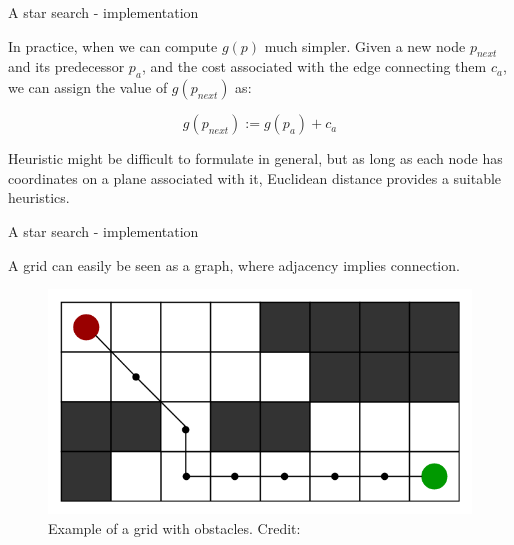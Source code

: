 \documentclass{beamer}
\begin{document}
\begin{frame}{A star search - implementation}
	\begin{flushleft}
		
		In practice, when we can compute $g(p)$ much simpler. Given a new node $p_{next}$ and its predecessor $p_a$, and the cost associated with the edge connecting them $c_a$, we can assign the value of $g(p_{next})$ as:
		
		\begin{equation}
			g(p_{next}) := g(p_a) + c_a
		\end{equation}
	
		Heuristic might be difficult to formulate in general, but as long as each node has coordinates on a plane associated with it, Euclidean distance provides a suitable heuristics.
		
	\end{flushleft}
\end{frame}



\begin{frame}{A star search - implementation}
	\begin{flushleft}
		
		A grid can easily be seen as a graph, where adjacency implies connection.
		
		\begin{figure}
			\centering
			\includegraphics[width=0.7\linewidth]{a_-search-algorithm-1}
			\caption{Example of a grid with obstacles. Credit: }
			\label{fig:a-search-algorithm-1}
		\end{figure}
		
		
	\end{flushleft}
\end{frame}




\myqrframe
\end{document}
